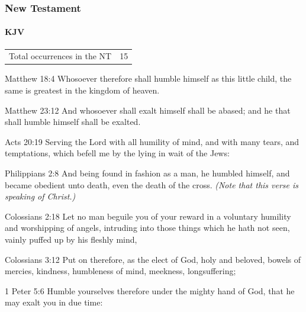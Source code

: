 		
		
	\subsubsection{New Testament} %
		\label{HUMILITY-NT}
	
		\paragraph{KJV}
			\label{HUMILITY-NT-KJV}
			
	
			\begin{tabular}{ll}
				Total occurrences in the NT & 15
			\end{tabular}
			
			\begin{compactdesc}
				\item[Matthew 18:4] Whosoever therefore shall humble himself as this little child, the same is greatest in the kingdom of heaven.
				\item[Matthew 23:12] And whosoever shall exalt himself shall be abased; and he that shall humble himself shall be exalted.
				\item[Acts 20:19] Serving the Lord with all humility of mind, and with many tears, and temptations, which befell me by the lying in wait of the Jews:
				\item[Philippians 2:8] And being found in fashion as a man, he humbled himself, and became obedient unto death, even the death of the cross. \textit{(Note that this verse is speaking of Christ.)}
				\item[Colossians 2:18] Let no man beguile you of your reward in a voluntary humility and worshipping of angels, intruding into those things which he hath not seen, vainly puffed up by his fleshly mind,
				\item[Colossians 3:12] Put on therefore, as the elect of God, holy and beloved, bowels of mercies, kindness, humbleness of mind, meekness, longsuffering;
				\item[1 Peter 5:6] Humble yourselves therefore under the mighty hand of God, that he may exalt you in due time:
			\end{compactdesc}
			
